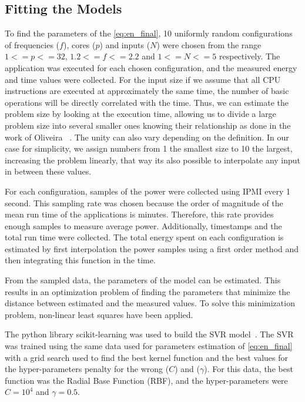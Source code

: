\documentclass{ieeeaccess}
\begin{document}
\subsection{Fitting the Models} \label{sec:fitting}
To find the parameters of the \cref{eq:en_final}, 10 uniformly random configurations of frequencies ($f$), cores ($p$) and inputs ($N$) were chosen from the range $1<=p<=32$, $1.2<=f<=2.2$ and $1<=N<=5$ respectively. The application was executed for each chosen configuration, and the measured  energy and time values were collected. For the input size if we assume that all CPU instructions are executed at approximately the same time, the number of basic operations will be directly correlated with the time. Thus, we can estimate the problem size by looking at the execution time, allowing us to divide a large problem size into several smaller ones knowing their relationship as done in the work of Oliveira ~\cite{Oliveira2018ApplicationCores}. The unity can also vary depending on the definition. In our case for simplicity, we assign numbers from 1 the smallest size to 10 the largest, increasing the problem linearly, that way its also possible to interpolate any input in between these values.


For each configuration, samples of the power were collected using IPMI every 1 second. This sampling rate was chosen because the order of magnitude of the mean run time of the applications is minutes. Therefore, this rate provides enough samples to measure average power. Additionally, timestamps and the total run time were collected. The total energy spent on each configuration is estimated by first interpolation the power samples using a first order method and then integrating this function in the time.

From the sampled data, the parameters of the model can be estimated. This results in an optimization problem of finding the parameters that minimize the distance between estimated and the measured values. To solve this minimization problem, non-linear least squares have been applied. 

The python library scikit-learning was used to build the SVR model~\cite{PedregosaFandVaroquauxGandGramfortAandMichel2011Scikit-learn:Python}. The SVR was trained using the same data used for parameters estimation of \cref{eq:en_final} with a grid search used to find the best kernel function and the best values for the hyper-parameters penalty for the wrong ($C$) and ($\gamma$). For this data, the best function was the Radial Base Function (RBF), and the hyper-parameters were $C=10^4$ and $\gamma=0.5$. 
\end{document}
